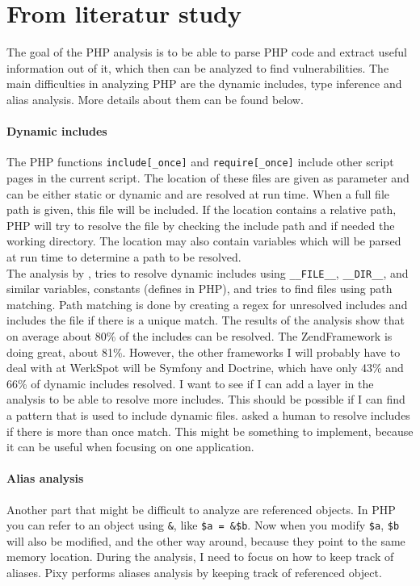 \documentclass[../main.tex]{subfiles}
\begin{document}
    
    \section{From literatur study}
    \label{phpdynamics}
The goal of the PHP analysis is to be able to parse PHP code and extract useful information out of it, which then can be analyzed to find vulnerabilities.
The main difficulties in analyzing PHP are the dynamic includes, type inference and alias analysis. 
More details about them can be found below.
\paragraph{Dynamic includes}
\label{includes}
The PHP functions \texttt{include[\_once]} and \texttt{require[\_once]} include other script pages in the current script.
The location of these files are given as parameter and can be either static or dynamic and are resolved at run time.
When a full file path is given, this file will be included.
If the location contains a relative path, PHP will try to resolve the file by checking the include path and if needed the working directory.
The location may also contain variables which will be parsed at run time to determine a path to be resolved.
\\
The analysis by  \autocite{Hil:12}, tries to resolve dynamic includes using \texttt{\_\_FILE\_\_}, \texttt{\_\_DIR\_\_}, and similar variables, constants (defines in PHP), and tries to find files using path matching.
Path matching is done by creating a regex for unresolved includes and includes the file if there is a unique match.
The results of the analysis show that on average about 80\% of the includes can be resolved.
The ZendFramework is doing great, about 81\%. However, the other frameworks I will probably have to deal with at WerkSpot will be Symfony and Doctrine, which have only 43\% and 66\% of dynamic includes resolved. 
I want to see if I can add a layer in the analysis to be able to resolve more includes. 
This should be possible if I can find a pattern that is used to include dynamic files.
 \autocite{Son:11} asked a human to resolve includes if there is more than once match.
This might be something to implement, because it can be useful when focusing on one application.

\paragraph{Alias analysis}
\label{alias}
Another part that might be difficult to analyze are referenced objects.
In PHP you can refer to an object using \texttt{\&}, like \texttt{\$a = \&\$b}.
Now when you modify \texttt{\$a}, \texttt{\$b} will also be modified, and the other way around, because they point to the same memory location.
During the analysis, I need to focus on how to keep track of aliases. 
Pixy \autocite{Jov:06} performs aliases analysis by keeping track of referenced object.
\end{document}
